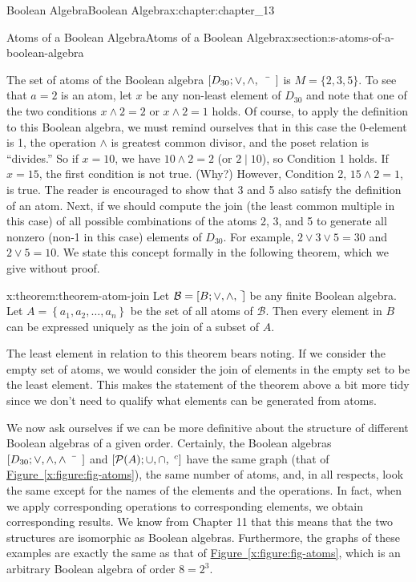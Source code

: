 \documentclass[oneside,10pt,]{book}
\newcommand{\xreffont}{\relax}
\numberwithin{equation}{section}
\begin{document}
\begin{chapterptx}{Boolean Algebra}{}{Boolean Algebra}{}{}{x:chapter:chapter_13}
\begin{sectionptx}{Atoms of a Boolean Algebra}{}{Atoms of a Boolean Algebra}{}{}{x:section:s-atoms-of-a-boolean-algebra}
\par
The set of atoms of the Boolean algebra \(\left[D_{30}; \lor , \land, \bar{\hspace{5 mm}}\right]\) is \(M = \{2, 3, 5\}\). To see that \(a = 2\) is an atom, let \(x\) be any non-least element of \(D_{30}\) and note that one of the two conditions \(x \land  2 = 2\) or \(x \land
2 = 1\) holds. Of course, to apply the definition to this Boolean algebra, we must remind ourselves that in this case the 0-element is 1, the operation \(\land\) is greatest common divisor, and the poset relation is ``divides.'' So if \(x = 10\), we have \(10 \land  2 = 2\) (or \(2 \mid 10\)), so Condition 1 holds. If \(x = 15\), the first condition is not true. (Why?) However, Condition 2, \(15 \land  2 = 1\), is true. The reader is encouraged to show that 3 and 5 also satisfy the definition of an atom. Next, if we should compute the join (the least common multiple in this case) of all possible combinations of the atoms 2, 3, and 5 to generate all nonzero (non-1 in this case) elements of \(D_{30}\). For example, \(2 \lor  3 \lor  5 = 30\) and \(2 \lor  5 = 10\). We state this concept formally in the following theorem, which we give without proof.%
\begin{theorem}{}{}{x:theorem:theorem-atom-join}%
Let \(\mathcal{B}=[B; \lor, \land, \hspace{1 mm}^{\bar{}}] \) be any finite Boolean algebra. Let  \(A = \left\{a_1, a_2, \dots ,a_n\right\}\) be the set of all atoms of \(\mathcal{B}\). Then every element in \(B\) can be expressed uniquely as the join of a subset of \(A\).%
\end{theorem}
The least element in relation to this theorem bears noting.  If we consider the empty set of atoms, we would consider the join of elements in the empty set to be the least element. This makes the statement of the theorem above a bit more tidy since we don't need to qualify what elements can be generated from atoms.%
\par
We now ask ourselves if we can be more definitive about the structure of different Boolean algebras of a given order. Certainly, the Boolean algebras \(\left[D_{30}; \lor , \land, \land\bar{\hspace{5 mm}} \right]\) and \([\mathcal{P}(A);  \cup , \cap, \hspace{1 mm}^c]\) have the same graph (that of \hyperref[x:figure:fig-atoms]{Figure~{\xreffont\ref{x:figure:fig-atoms}}}), the same number of atoms, and, in all respects, look the same except for the names of the elements and the operations. In fact, when we apply corresponding operations to corresponding elements, we obtain corresponding results. We know from Chapter 11 that this means that the two structures are isomorphic as Boolean algebras. Furthermore, the graphs of these examples are exactly the same as that of \hyperref[x:figure:fig-atoms]{Figure~{\xreffont\ref{x:figure:fig-atoms}}}, which is an arbitrary Boolean algebra of order \(8 = 2^3\).%

\end{sectionptx}
\end{chapterptx}
\end{document}
